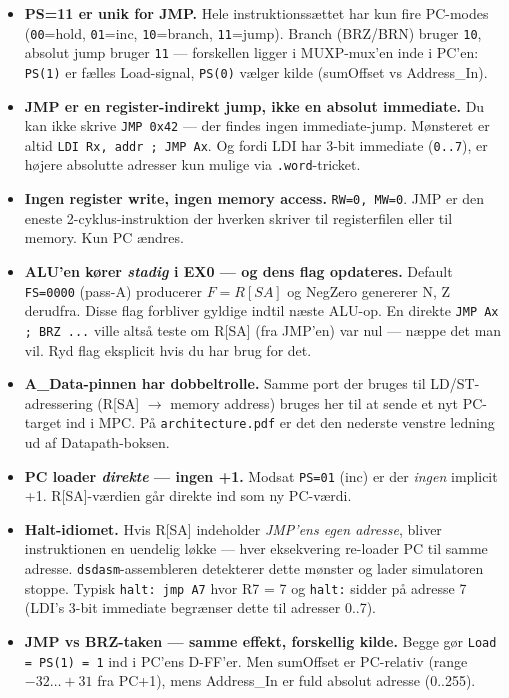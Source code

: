\documentclass[11pt,a4paper]{article}
\begin{document}
\begin{itemize}
  \item \textbf{PS=11 er unik for JMP.} Hele instruktionssættet har kun fire PC-modes
        (\texttt{00}=hold, \texttt{01}=inc, \texttt{10}=branch, \texttt{11}=jump). Branch (BRZ/BRN) bruger \texttt{10},
        absolut jump bruger \texttt{11} --- forskellen ligger i MUXP-mux'en inde i PC'en:
        \texttt{PS(1)} er fælles Load-signal, \texttt{PS(0)} vælger kilde (sumOffset vs Address\_In).

  \item \textbf{JMP er en register-indirekt jump, ikke en absolut immediate.}
        Du kan ikke skrive \texttt{JMP 0x42} --- der findes ingen immediate-jump.
        Mønsteret er altid \texttt{LDI Rx, addr ; JMP Ax}. Og fordi LDI har 3-bit immediate
        (\texttt{0..7}), er højere absolutte adresser kun mulige via \texttt{.word}-tricket.

  \item \textbf{Ingen register write, ingen memory access.}
        \texttt{RW=0, MW=0}. JMP er den eneste 2-cyklus-instruktion der hverken skriver til registerfilen eller til memory.
        Kun PC ændres.

  \item \textbf{ALU'en kører \emph{stadig} i EX0 --- og dens flag opdateres.}
        Default \texttt{FS=0000} (pass-A) producerer $F = R[SA]$ og NegZero genererer N, Z derudfra.
        Disse flag forbliver gyldige indtil næste ALU-op. En direkte \texttt{JMP Ax ; BRZ ...}
        ville altså teste om R[SA] (fra JMP'en) var nul --- næppe det man vil. Ryd flag eksplicit
        hvis du har brug for det.

  \item \textbf{A\_Data-pinnen har dobbeltrolle.}
        Samme port der bruges til LD/ST-adressering (R[SA] $\rightarrow$ memory address) bruges her
        til at sende et nyt PC-target ind i MPC. På \texttt{architecture.pdf} er det den nederste
        venstre ledning ud af Datapath-boksen.

  \item \textbf{PC loader \emph{direkte} --- ingen +1.}
        Modsat \texttt{PS=01} (inc) er der \emph{ingen} implicit +1. R[SA]-værdien går direkte
        ind som ny PC-værdi.

  \item \textbf{Halt-idiomet.}
        Hvis R[SA] indeholder \emph{JMP'ens egen adresse}, bliver instruktionen en uendelig løkke ---
        hver eksekvering re-loader PC til samme adresse. \texttt{dsdasm}-assembleren detekterer
        dette mønster og lader simulatoren stoppe. Typisk \texttt{halt: jmp A7} hvor R7 = 7
        og \texttt{halt:} sidder på adresse 7 (LDI's 3-bit immediate begrænser dette til adresser 0..7).

  \item \textbf{JMP vs BRZ-taken --- samme effekt, forskellig kilde.}
        Begge gør \texttt{Load = PS(1) = 1} ind i PC'ens D-FF'er. Men sumOffset er PC-relativ
        (range $-32 \ldots +31$ fra PC+1), mens Address\_In er fuld absolut adresse (0..255).
\end{itemize}
\end{document}
